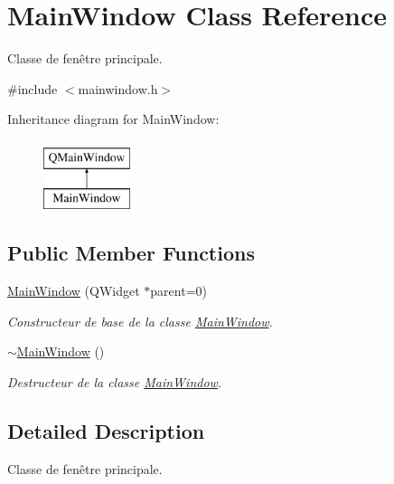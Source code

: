 \hypertarget{class_main_window}{}\section{Main\+Window Class Reference}
\label{class_main_window}


Classe de fenêtre principale.  




{\ttfamily \#include $<$mainwindow.\+h$>$}

Inheritance diagram for Main\+Window\+:\begin{figure}[H]
\begin{center}
\leavevmode
\includegraphics[height=2.000000cm]{class_main_window}
\end{center}
\end{figure}
\subsection*{Public Member Functions}
\begin{DoxyCompactItemize}
\item 
\hyperlink{class_main_window_a8b244be8b7b7db1b08de2a2acb9409db}{Main\+Window} (Q\+Widget $\ast$parent=0)
\begin{DoxyCompactList}\small\item\em Constructeur de base de la classe \hyperlink{class_main_window}{Main\+Window}. \end{DoxyCompactList}\item 
\hypertarget{class_main_window_ae98d00a93bc118200eeef9f9bba1dba7}{}\hyperlink{class_main_window_ae98d00a93bc118200eeef9f9bba1dba7}{$\sim$\+Main\+Window} ()\label{class_main_window_ae98d00a93bc118200eeef9f9bba1dba7}

\begin{DoxyCompactList}\small\item\em Destructeur de la classe \hyperlink{class_main_window}{Main\+Window}. \end{DoxyCompactList}\end{DoxyCompactItemize}


\subsection{Detailed Description}
Classe de fenêtre principale. 

